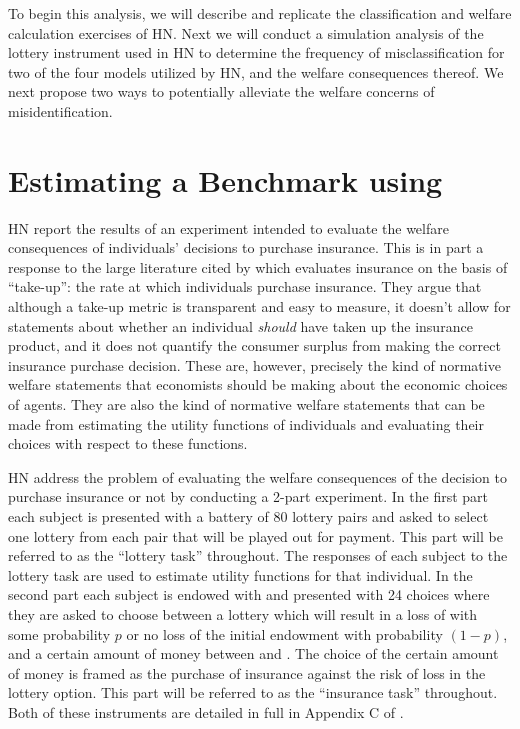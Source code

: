 \documentclass[../main.tex]{subfiles}
\begin{document}
To begin this analysis, we will describe and replicate the classification and welfare calculation exercises of HN.
Next we will conduct a simulation analysis of the lottery instrument used in HN to determine the frequency of misclassification for two of the four models utilized by HN, and the welfare consequences thereof.
We next propose two ways to potentially alleviate the welfare concerns of misidentification.

\section{Estimating a Benchmark using \texorpdfstring{\textcite{Harrison2016}}{Harrison and Ng (2015)}}
\label{sec4:Bench}

HN report the results of an experiment intended to evaluate the welfare consequences of individuals' decisions to purchase insurance.
This is in part a response to the large literature cited by \textcite[92]{Harrison2016} which evaluates insurance on the basis of \enquote{take-up}: the rate at which individuals purchase insurance.
They argue that although a take-up metric is transparent and easy to measure, it doesn't allow for statements about whether an individual \textit{should} have taken up the insurance product, and it does not quantify the consumer surplus from making the correct insurance purchase decision.
These are, however, precisely the kind of normative welfare statements that economists should be making about the economic choices of agents.
They are also the kind of normative welfare statements that can be made from estimating the utility functions of individuals and evaluating their choices with respect to these functions.

HN address the problem of evaluating the welfare consequences of the decision to purchase insurance or not by conducting a 2-part experiment.
In the first part each subject is presented with a battery of 80 lottery pairs and asked to select one lottery from each pair that will be played out for payment.
This part will be referred to as the \enquote{lottery task} throughout.
The responses of each subject to the lottery task are used to estimate utility functions for that individual.
In the second part each subject is endowed with  and presented with 24 choices where they are asked to choose between a lottery which will result in a loss of  with some probability $p$ or no loss of the initial endowment with probability $(1-p)$, and a certain amount of money between  and .
The choice of the certain amount of money is framed as the purchase of insurance against the risk of loss in the lottery option.
This part will be referred to as the \enquote{insurance task} throughout.
Both of these instruments are detailed in full in Appendix C of \textcite{Harrison2016}.
\end{document}
